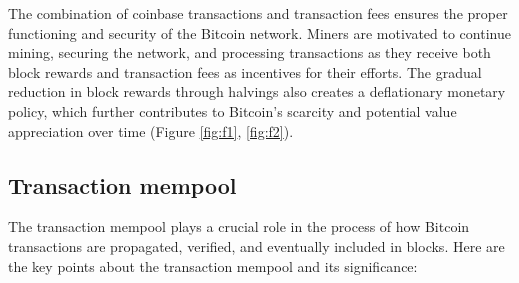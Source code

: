 The combination of coinbase transactions and transaction fees ensures the proper functioning and security of the Bitcoin network. Miners are motivated to continue mining, securing the network, and processing transactions as they receive both block rewards and transaction fees as incentives for their efforts. The gradual reduction in block rewards through halvings also creates a deflationary monetary policy, which further contributes to Bitcoin's scarcity and potential value appreciation over time (Figure \ref{fig:f1}, \ref{fig:f2}).

\subsection{Transaction mempool}
The transaction mempool plays a crucial role in the process of how Bitcoin transactions are propagated, verified, and eventually included in blocks. Here are the key points about the transaction mempool and its significance:
